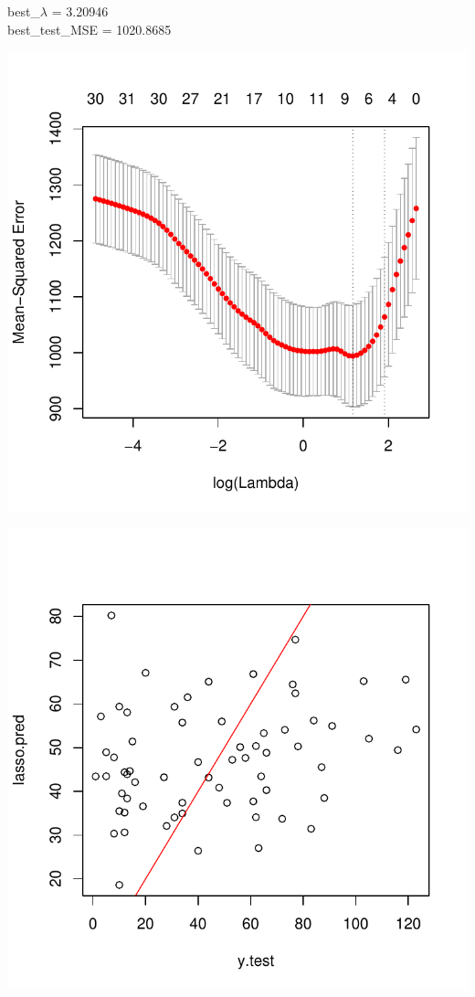 \documentclass[]{report}
\begin{document}
\begin{center} 
	best\_$\lambda$ = 3.20946 \\
	best\_test\_MSE = 1020.8685
\end{center} 


\begin{center}
	\includegraphics[width=0.8\linewidth]{Figures/lasso_mse.pdf}
\end{center}

\begin{center}
	\includegraphics[width=0.8\linewidth]{Figures/lasso_predicted.pdf}
\end{center}
\end{document}
